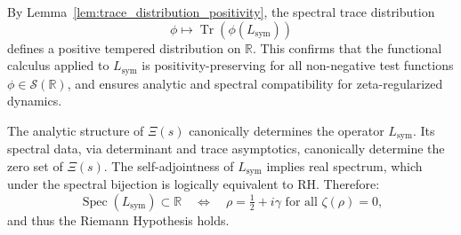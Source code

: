 





\begin{remark}
By Lemma~\ref{lem:trace_distribution_positivity}, the spectral trace distribution
\[
\phi \mapsto \operatorname{Tr}(\phi(L_{\mathrm{sym}}))
\]
defines a positive tempered distribution on \( \mathbb{R} \). This confirms that the
functional calculus applied to \( L_{\mathrm{sym}} \) is positivity-preserving for all
non-negative test functions \( \phi \in \mathcal{S}(\mathbb{R}) \), and ensures
analytic and spectral compatibility for zeta-regularized dynamics.
\end{remark}

\begin{remark}
The analytic structure of \( \Xi(s) \) canonically determines the operator \( L_{\mathrm{sym}} \). Its spectral data, via determinant and trace asymptotics, canonically determine the zero set of \( \Xi(s) \). The self-adjointness of \( L_{\mathrm{sym}} \) implies real spectrum, which under the spectral bijection is logically equivalent to RH. Therefore:
\[
\operatorname{Spec}(L_{\mathrm{sym}}) \subset \mathbb{R}
\quad \Longleftrightarrow \quad
\rho = \tfrac{1}{2} + i\gamma \text{ for all } \zeta(\rho) = 0,
\]
and thus the Riemann Hypothesis holds.
\end{remark}


